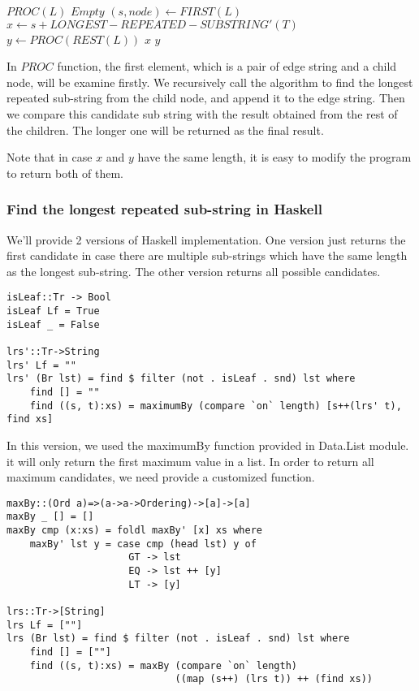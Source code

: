 \documentclass{article}
\begin{document}
\begin{algorithmic}
\STATE $PROC(L)$
    \RETURN $Empty$
  \ELSE
    \STATE $(s, node) \leftarrow FIRST(L)$
    \STATE $x \leftarrow s + LONGEST-REPEATED-SUBSTRING'(T)$
    \STATE $y \leftarrow PROC(REST(L))$
      \RETURN $x$
    \ELSE
      \RETURN $y$
    \ENDIF
  \ENDIF
\end{algorithmic}

In $PROC$ function, the first element, which is a pair of edge string
and a child node, will be examine firstly. We recursively call the 
algorithm to find the longest repeated sub-string from the child node,
and append it to the edge string. Then we compare this candidate
sub string with the result obtained from the rest of the children.
The longer one will be returned as the final result.

Note that in case $x$ and $y$ have the same length, it is easy to
modify the program to return both of them.

\subsubsection*{Find the longest repeated sub-string in Haskell}
We'll provide 2 versions of Haskell implementation. One version
just returns the first candidate in case there are multiple sub-strings
which have the same length as the longest sub-string. The other
version returns all possible candidates.

\lstset{language=Haskell}
\begin{lstlisting}
isLeaf::Tr -> Bool
isLeaf Lf = True
isLeaf _ = False

lrs'::Tr->String
lrs' Lf = ""
lrs' (Br lst) = find $ filter (not . isLeaf . snd) lst where
    find [] = ""
    find ((s, t):xs) = maximumBy (compare `on` length) [s++(lrs' t), find xs]
\end{lstlisting} %

In this version, we used the maximumBy function provided in Data.List
module. it will only return the first maximum value in a list.
In order to return all maximum candidates, we need provide a customized
function.

\begin{lstlisting}
maxBy::(Ord a)=>(a->a->Ordering)->[a]->[a]
maxBy _ [] = []
maxBy cmp (x:xs) = foldl maxBy' [x] xs where
    maxBy' lst y = case cmp (head lst) y of
                     GT -> lst
                     EQ -> lst ++ [y]
                     LT -> [y]

lrs::Tr->[String]
lrs Lf = [""]
lrs (Br lst) = find $ filter (not . isLeaf . snd) lst where
    find [] = [""]
    find ((s, t):xs) = maxBy (compare `on` length) 
                             ((map (s++) (lrs t)) ++ (find xs))
\end{lstlisting} %
\end{document}
